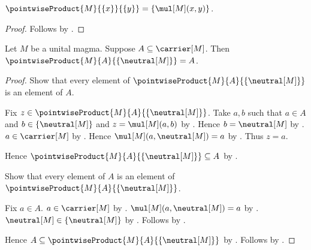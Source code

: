 \begin{proposition}\label{pointwise_product_singletons}
    $\pointwiseProduct{M}{\{x\}}{\{y\}}
        =\{\mul[M](x,y)\}$.
\end{proposition}
\begin{proof}
    Follows by
        .
\end{proof}

\begin{proposition}\label{pointwise_product_neutral_singleton_right}
    Let $M$ be a unital magma.
    Suppose $A\subseteq\carrier[M]$.
    Then $\pointwiseProduct{M}{A}{\{\neutral[M]\}}=A$.
\end{proposition}
\begin{proof}
    Show that every element of
        $\pointwiseProduct{M}{A}{\{\neutral[M]\}}$ is an element of $A$.
    \begin{subproof}
        Fix $z\in\pointwiseProduct{M}{A}{\{\neutral[M]\}}$.
        Take $a,b$ such that $a\in A$ and $b\in\{\neutral[M]\}$ and
            $z=\mul[M](a,b)$ by .
        Hence $b=\neutral[M]$ by .
        $a\in\carrier[M]$ by .
        Hence $\mul[M](a,\neutral[M])=a$ by
            .
        Thus $z=a$.
    \end{subproof}
    Hence $\pointwiseProduct{M}{A}{\{\neutral[M]\}}\subseteq A$ by
        .

    Show that every element of $A$ is an element of
        $\pointwiseProduct{M}{A}{\{\neutral[M]\}}$.
    \begin{subproof}
        Fix $a\in A$.
        $a\in\carrier[M]$ by .
        $\mul[M](a,\neutral[M])=a$ by .
        $\neutral[M]\in\{\neutral[M]\}$ by .
        Follows by .
    \end{subproof}
    Hence $A\subseteq\pointwiseProduct{M}{A}{\{\neutral[M]\}}$ by
        .
    Follows by .
\end{proof}

